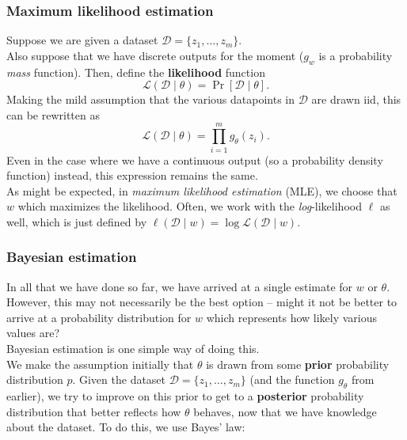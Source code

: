 \documentclass{article}
\begin{document}


		\subsubsection{Maximum likelihood estimation}

			Suppose we are given a dataset $\mathcal{D} = \{z_1,\ldots,z_m\}$.\\
			Also suppose that we have discrete outputs for the moment ($g_w$ is a probability \emph{mass} function). Then, define the \textbf{likelihood} function
			\[ \mathcal{L}(\mathcal{D} \mid \theta) = \Pr[ \mathcal{D} \mid \theta ]. \]
			Making the mild assumption that the various datapoints in $\mathcal{D}$ are drawn iid, this can be rewritten as
			\[ \mathcal{L}(\mathcal{D} \mid \theta) = \prod_{i=1}^m g_\theta(z_i). \]
			Even in the case where we have a continuous output (so a probability density function) instead, this expression remains the same.\\
			As might be expected, in \emph{maximum likelihood estimation} (MLE), we choose that $w$ which maximizes the likelihood. Often, we work with the \emph{log}-likelihood $\ell$ as well, which is just defined by $\ell(\mathcal{D} \mid w) = \log \mathcal{L}(\mathcal{D} \mid w)$.

		\subsubsection{Bayesian estimation}

			In all that we have done so far, we have arrived at a single estimate for $w$ or $\theta$. However, this may not necessarily be the best option -- might it not be better to arrive at a probability distribution for $w$ which represents how likely various values are?\\
			Bayesian estimation is one simple way of doing this.\\

			We make the assumption initially that $\theta$ is drawn from some \textbf{prior} probability distribution $p$. Given the dataset $\mathcal{D} = \{z_1,\ldots,z_m\}$ (and the function $g_\theta$ from earlier), we try to improve on this prior to get to a \textbf{posterior} probability distribution that better reflects how $\theta$ behaves, now that we have knowledge about the dataset. To do this, we use Bayes' law:
\end{document}
